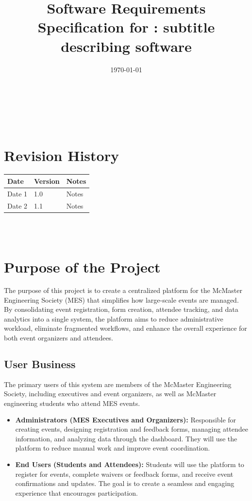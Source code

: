 \documentclass[12pt]{article}
\begin{document}
\title{Software Requirements Specification for \progname: subtitle describing software}
\author{\authname}
\date{\today}

\maketitle

~\newpage


\tableofcontents

~\newpage

\section*{Revision History}

\begin{tabularx}{\textwidth}{p{3cm}p{2cm}X}
\toprule {\textbf{Date}} & {\textbf{Version}} & {\textbf{Notes}}\\
\midrule
Date 1 & 1.0 & Notes\\
Date 2 & 1.1 & Notes\\
\bottomrule
\end{tabularx}

~\\

~\newpage
\section{Purpose of the Project}

The purpose of this project is to create a centralized platform for the McMaster Engineering Society (MES) that simplifies how large-scale events are managed. By consolidating event registration, form creation, attendee tracking, and data analytics into a single system, the platform aims to reduce administrative workload, eliminate fragmented workflows, and enhance the overall experience for both event organizers and attendees.

\subsection{User Business}

The primary users of this system are members of the McMaster Engineering Society, including executives and event organizers, as well as McMaster engineering students who attend MES events.  

\begin{itemize}
    \item \textbf{Administrators (MES Executives and Organizers):} Responsible for creating events, designing registration and feedback forms, managing attendee information, and analyzing data through the dashboard. They will use the platform to reduce manual work and improve event coordination.
    \item \textbf{End Users (Students and Attendees):} Students will use the platform to register for events, complete waivers or feedback forms, and receive event confirmations and updates. The goal is to create a seamless and engaging experience that encourages participation.
\end{itemize}
\end{document}
